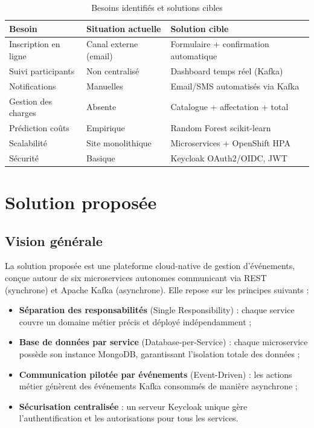 \documentclass[12pt,a4paper]{report}
\newcommand{\tH}[1]{\cellcolor{lightBlue}\textbf{#1}}
\begin{document}
\begin{table}[H]
\centering
\caption{Besoins identifi\'es et solutions cibles}
\label{tab:besoins}
\renewcommand{\arraystretch}{1.4}
\begin{tabularx}{\textwidth}{L{4cm} L{4cm} L{5.5cm}}
\hline
\tH{Besoin} & \tH{Situation actuelle} & \tH{Solution cible} \\
\hline
Inscription en ligne    & Canal externe (email) & Formulaire + confirmation automatique \\
\hline
Suivi participants      & Non centralis\'e      & Dashboard temps r\'eel (Kafka) \\
\hline
Notifications           & Manuelles             & Email/SMS automatis\'es via Kafka \\
\hline
Gestion des charges     & Absente               & Catalogue + affectation + total \\
\hline
Pr\'ediction co\^uts   & Empirique             & Random Forest scikit-learn \\
\hline
Scalabilit\'e          & Site monolithique     & Microservices + OpenShift HPA \\
\hline
S\'ecurit\'e           & Basique               & Keycloak OAuth2/OIDC, JWT \\
\hline
\end{tabularx}
\end{table}

\section{Solution propos\'ee}

\subsection{Vision g\'en\'erale}

La solution propos\'ee est une plateforme cloud-native de gestion d'\'ev\'enements,
con\c{c}ue autour de six microservices autonomes communicant via REST (synchrone) et
Apache Kafka (asynchrone). Elle repose sur les principes suivants :

\begin{itemize}[noitemsep]
  \item \textbf{S\'eparation des responsabilit\'es} (Single Responsibility) : chaque service
  couvre un domaine m\'etier pr\'ecis et d\'eploy\'e ind\'ependamment ;
  \item \textbf{Base de donn\'ees par service} (Database-per-Service) : chaque microservice
  poss\`ede son instance MongoDB, garantissant l'isolation totale des donn\'ees ;
  \item \textbf{Communication pilot\'ee par \'ev\'enements} (Event-Driven) : les actions m\'etier
  g\'en\`erent des \'ev\'enements Kafka consomm\'es de mani\`ere asynchrone ;
  \item \textbf{S\'ecurisation centralis\'ee} : un serveur Keycloak unique g\`ere l'authentification
  et les autorisations pour tous les services.
\end{itemize}
\end{document}
